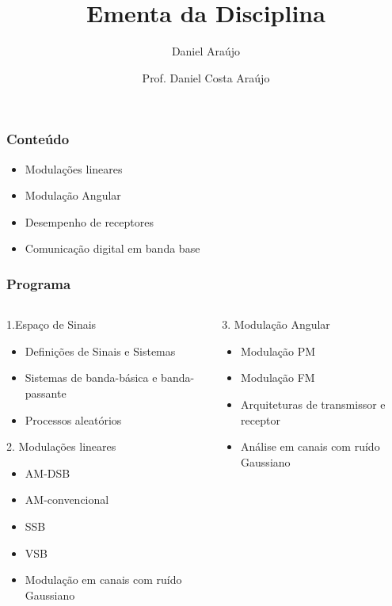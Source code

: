 \documentclass[10pt,hyperref={pdfpagemode=FullScreen},aspectratio=169]{beamer}
\title{\doctitle}
\author{Daniel Araújo}
\institute{\universidade}
\title{Ementa da Disciplina}
\author{Prof. Daniel Costa Araújo}
\begin{document}
\frame{\titlepage}


\begin{frame}
  \frametitle{Conteúdo}

  \begin{itemize}
    \item Modulações lineares
    \item Modulação Angular
    \item Desempenho de receptores
    \item Comunicação digital em banda base
  \end{itemize}

\end{frame}

\begin{frame}
  \frametitle{Programa}
\begin{columns}[T]
  \begin{column}{0.5\textwidth}
    \begin{block}{1.Espaço de Sinais}
      \begin{itemize}
        \item Definições de Sinais e Sistemas
        \item Sistemas de banda-básica e banda-passante
        \item Processos aleatórios
      \end{itemize}
    \end{block}
  
    \begin{block}{2. Modulações lineares}
      \begin{itemize}
        \item AM-DSB
        \item AM-convencional
        \item SSB
        \item VSB
        \item Modulação em canais com ruído Gaussiano
      \end{itemize}
    \end{block}
  \end{column}

  \begin{column}{0.5\textwidth}
    \begin{block}{3. Modulação Angular}
      
       \begin{itemize}
        \item Modulação PM
        \item Modulação FM
        \item Arquiteturas de transmissor e receptor
        \item Análise em canais com ruído Gaussiano
       \end{itemize}
  

\end{block}
\end{column}
\end{columns}
\end{frame}
\end{document}
